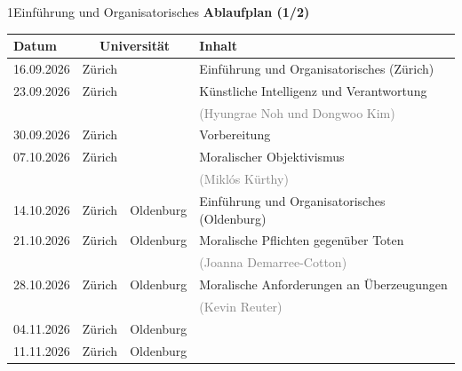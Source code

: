 \documentclass[xcolor=table,9pt,aspectratio=169]{beamer}
\begin{document}
\begin{frame}{\vspace*{10mm}1\hspace*{1em}Einführung und Organisatorisches}
\textbf{Ablaufplan (1/2)}

\smallskip
\begin{tabular}{lllp{6.6cm}}
   \arrayrulecolor{blue2}\hline
   Datum        & \multicolumn{2}{c}{Universität}   & Inhalt                                             \\
   \hline
   16.09.2026   & Zürich   &                        & Einführung und Organisatorisches (Zürich)          \\
   23.09.2026   & Zürich   &                        & Künstliche Intelligenz und Verantwortung           \\
                &          &                        & \textcolor{gray}{(Hyungrae Noh und Dongwoo Kim)}   \\
   30.09.2026   & Zürich   &                        & Vorbereitung                                       \\
   07.10.2026   & Zürich   &                        & Moralischer Objektivismus                          \\
                &          &                        & \textcolor{gray}{(Miklós Kürthy)}                  \\
   14.10.2026   & Zürich   & Oldenburg              & Einführung und Organisatorisches (Oldenburg)       \\
   21.10.2026   & Zürich   & Oldenburg              & Moralische Pflichten gegenüber Toten               \\
                &          &                        & \textcolor{gray}{(Joanna Demarree-Cotton)}         \\
   28.10.2026   & Zürich   & Oldenburg              & Moralische Anforderungen an Überzeugungen          \\
                &          &                        & \textcolor{gray}{(Kevin Reuter)}                   \\
   04.11.2026   & Zürich   & Oldenburg              &                                                    \\
   11.11.2026   & Zürich   & Oldenburg              &                                                    \\
   \hline
\end{tabular}
\end{frame}
\end{document}
